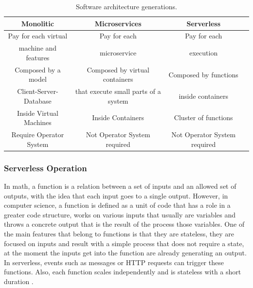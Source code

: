 \documentclass[runningheads]{llncs}
\begin{document}
\begin{table}[htp]
  \caption{Software architecture generations.}
  \label{table:architectures}
  \centering
  \begin{tabular}{|c|c|c|c|}
  \hline
  Monolitic & Microservices & Serverless \\
  \hline
  Pay for each virtual  & Pay for each  & Pay for each \\
  machine and features & microservice & execution \\
  \hline
  Composed by a model  & Composed by virtual containers & Composed by functions \\
  Client-Server-Database & that execute small parts of a system & inside containers \\
  \hline
  Inside Virtual Machines & Inside Containers & Cluster of functions\\
  \hline
  Require Operator System & Not Operator System required & Not Operator System required\\
  \hline
  \end{tabular}
  \end{table}


\subsubsection{Serverless Operation} 
In math, a function is a relation between a set of inputs and an allowed set of
outputs, with the idea that each input goes to a single output. However, in
computer science, a function is defined as a unit of code that has a role in a
greater code structure, works on various inputs that usually are variables and
throws a concrete output that is the result of the process those variables. One
of the main features that belong to functions is that they are stateless, they
are focused on inputs and result with a simple process that does not require a
state, at the moment the inputs get into the function are already generating an
output. In serverless, events such as messages or HTTP requests can trigger
these functions. Also, each function scales independently and is stateless with
a short duration \cite{Baird2016,Cook2017}.
\end{document}
